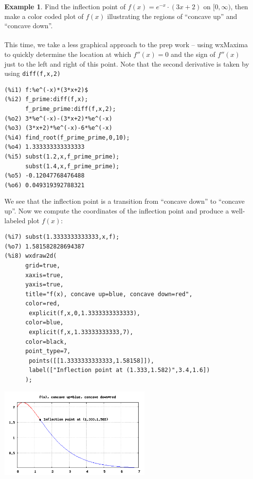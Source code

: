 \documentclass[10.5pt,twoside]{report}
\theoremstyle{definition}
\newtheorem{exmp}{Example}[section]
\begin{document}
\begin{exmp}

Find the inflection point of $f(x)=e^{-x}\cdot (3x+2)$ on $[0,\infty)$, then make a color coded plot of $f(x)$ illustrating the regions of ``concave up'' and ``concave down''.\\
${}$\\

This time, we take a less graphical approach to the prep work -- using wxMaxima to quickly determine the location at which $f''(x)=0$ and the sign of $f''(x)$ just to the left and right of this point. Note that the second derivative is taken by using \verb|diff(f,x,2)|

\begin{verbatim}
(%i1) f:%e^(-x)*(3*x+2)$
(%i2) f_prime:diff(f,x);
      f_prime_prime:diff(f,x,2);
(%o2) 3*%e^(-x)-(3*x+2)*%e^(-x)
(%o3) (3*x+2)*%e^(-x)-6*%e^(-x)
(%i4) find_root(f_prime_prime,0,10);
(%o4) 1.333333333333333
(%i5) subst(1.2,x,f_prime_prime);
      subst(1.4,x,f_prime_prime);
(%o5) -0.12047768476488
(%o6) 0.049319392788321
\end{verbatim}

We see that the inflection point is a transition from ``concave down'' to ``concave up''.  Now we compute the coordinates of the inflection point and produce a well-labeled plot $f(x)$:

\begin{verbatim}
(%i7) subst(1.3333333333333,x,f);
(%o7) 1.581582828694387
(%i8) wxdraw2d(
      grid=true,
      xaxis=true,
      yaxis=true,
      title="f(x), concave up=blue, concave down=red",
      color=red,
       explicit(f,x,0,1.3333333333333),
      color=blue,
       explicit(f,x,1.33333333333,7),
      color=black,
      point_type=7,
       points([[1.3333333333333,1.58158]]),
       label(["Inflection point at (1.333,1.582)",3.4,1.6])
      );
\end{verbatim}

\includegraphics[width=3in]{example_5_2_1}

\end{exmp}
\end{document}
